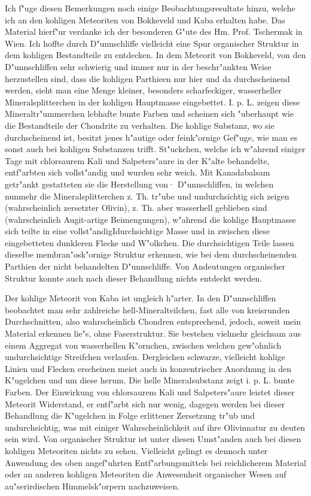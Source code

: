 \documentclass[a4paper, 11pt, oneside]{article}
\begin{document}
Ich f"uge diesen Bemerkungen noch einige Beobachtungsresultate hinzu, welche ich an den kohligen Meteoriten von Bokkeveld und Kaba erhalten habe. Das Material hierf"ur verdanke ich der besonderen G"ute des Hm. Prof. Tschermak in Wien. Ich hoffte durch D"unnschliffe vielleicht eine Spur organischer Struktur in dem kohligen Bestandteile zu entdecken. In dem Meteorit von Bokkeveld, von den D"unnschliffen sehr schwierig und immer nur in der beschr"ankten Weise herzustellen sind, dass die kohligen Parthieen nur hier und da durchscheinend werden, sieht man eine Menge kleiner, besonders scharfeckiger, wasserheller Mineralsplitterchen in der kohligen Hauptmasse eingebettet. I. p. L. zeigen diese Mineraltr"ummerchen lebhafte bunte Farben und scheinen sich "uberhaupt wie die Bestandteile der Chondrite zu verhalten. Die kohlige Substanz, wo sie durchscheinend ist, besitzt jenes h"autige oder feink"ornige Gef"uge, wie man es sonst auch bei kohligen Substanzen trifft. St"uckchen, welche ich w"ahrend einiger Tage mit chlorsaurem Kali und Salpeters"aure in der K"alte behandelte, entf"arbten sich vollst"andig und wurden sehr weich. Mit Kanadabalsam getr"ankt gestatteten sie die Herstellung von· D"unnschliffen, in welchen nunmehr die Mineralsplitterchen z. Th. tr"ube und undurchsichtig sich zeigen (wahrscheinlich zersetzter Olivin), z. Th. aber wasserhell geblieben sind (wahrscheinlich Augit-artige Beimengungen), w"ahrend die kohlige Hauptmasse sich teilte in eine vollst"andigIdurchsichtige Masse und in zwischen diese eingebetteten dunkleren Flecke und W"olkchen. Die durchsichtigen Teile lassen dieselbe membran"osk"ornige Struktur erkennen, wie bei dem durchscheinenden Parthien der nicht behandelten D"unnschliffe. Von Andeutungen organischer Struktur konnte auch nach dieser Behandlung nichts entdeckt werden.

Der kohlige Meteorit von Kaba ist ungleich h"arter. In den D"unnschliffen beobachtet man sehr zahlreiche hell-Mineralteilchen, fast alle von kreisrunden Durchschnitten, also wahrscheinlich Chondren entsprechend, jedoch, soweit mein Material erkennen lie"s, ohne Faserstruktur. Sie bestehen vielmehr gleichsam aus einem Aggregat von wasserhellen K"ornchen, zwischen welchen gew"ohnlich undurchsichtige Streifchen verlaufen. Dergleichen schwarze, vielleicht kohlige Linien und Flecken erscheinen meist auch in konzentrischer Anordnung in den K"ugelchen und um diese herum. Die helle Mineralsubstanz zeigt i. p. L. bunte Farben. Der Einwirkung von chlorsaurem Kali und Salpeters"aure leistet dieser Meteorit Widerstand, er entf"arbt sich nur wenig, dagegen werden bei dieser Behandlung die K"ugelchen in Folge erlittener Zersetzung tr"ub und undurchsichtig, was mit einiger Wahrscheinlichkeit auf ihre Olivinnatur zu deuten sein wird. Von organischer Struktur ist unter diesen Umst"anden auch bei diesen kohligen Meteoriten nichts zu sehen. Vielleicht gelingt es dennoch unter Anwendung des oben angef"uhrten Entf"arbungsmittels bei reichlicherem Material oder an anderen kohligen Meteoriten die Anwesenheit organischer Wesen auf au"serirdischen Himmelsk"orpern nachzuweisen.
\clearpage
\end{document}
